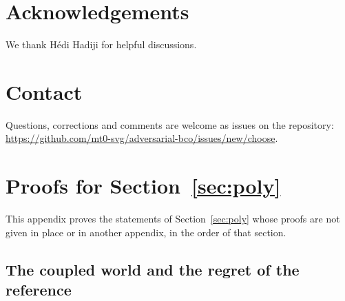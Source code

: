 \documentclass[11pt]{amsart}
\theoremstyle{definition}
\numberwithin{equation}{section}
\newcommand{\repo}{https://github.com/mt0-svg/adversarial-bco}
\begin{document}
\section*{Acknowledgements}

We thank H\'edi Hadiji for helpful discussions.

\section*{Contact}
Questions, corrections and comments are welcome as issues on the repository: \url{\repo/issues/new/choose}.




\appendix

\section{Proofs for Section~\ref{sec:poly}}\label{app:bitproofs}

This appendix proves the statements of Section~\ref{sec:poly} whose proofs are not given in place or in another appendix, in the order of that section.

\subsection*{The coupled world and the regret of the reference}
\end{document}
